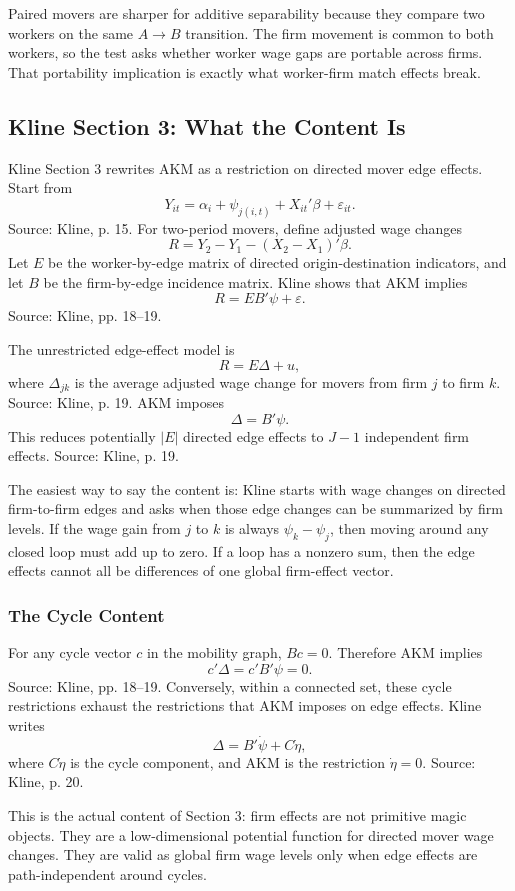 ﻿\documentclass[11pt]{article}
\newcommand{\1}{\mathbf{1}}
\begin{document}
Paired movers are sharper for additive separability because they compare two
workers on the same $A\to B$ transition. The firm movement is common to both
workers, so the test asks whether worker wage gaps are portable across firms. That
portability implication is exactly what worker-firm match effects break.

\subsection{Kline Section 3: What the Content Is}

Kline Section 3 rewrites AKM as a restriction on directed mover edge effects. Start
from
\[
Y_{it}=\alpha_i+\psi_{j(i,t)}+X_{it}'\beta+\varepsilon_{it}.
\]
Source: Kline, p. 15. For two-period movers, define adjusted wage changes
\[
R=Y_2-Y_1-(X_2-X_1)'\beta.
\]
Let $E$ be the worker-by-edge matrix of directed origin-destination indicators,
and let $B$ be the firm-by-edge incidence matrix. Kline shows that AKM implies
\[
R=EB'\psi+\varepsilon.
\]
Source: Kline, pp. 18--19.

The unrestricted edge-effect model is
\[
R=E\Delta+u,
\]
where $\Delta_{jk}$ is the average adjusted wage change for movers from firm $j$
to firm $k$. Source: Kline, p. 19. AKM imposes
\[
\Delta=B'\psi.
\]
This reduces potentially $|E|$ directed edge effects to $J-1$ independent firm
effects. Source: Kline, p. 19.

The easiest way to say the content is: Kline starts with wage changes on directed
firm-to-firm edges and asks when those edge changes can be summarized by firm
levels. If the wage gain from $j$ to $k$ is always $\psi_k-\psi_j$, then moving
around any closed loop must add up to zero. If a loop has a nonzero sum, then the
edge effects cannot all be differences of one global firm-effect vector.

\subsubsection{The Cycle Content}

For any cycle vector $c$ in the mobility graph, $Bc=0$. Therefore AKM implies
\[
c'\Delta=c'B'\psi=0.
\]
Source: Kline, pp. 18--19. Conversely, within a connected set, these cycle
restrictions exhaust the restrictions that AKM imposes on edge effects. Kline
writes
\[
\Delta=B'\dot\psi+C\dot\eta,
\]
where $C\dot\eta$ is the cycle component, and AKM is the restriction
$\dot\eta=0$. Source: Kline, p. 20.

This is the actual content of Section 3: firm effects are not primitive magic
objects. They are a low-dimensional potential function for directed mover wage
changes. They are valid as global firm wage levels only when edge effects are
path-independent around cycles.
\end{document}
